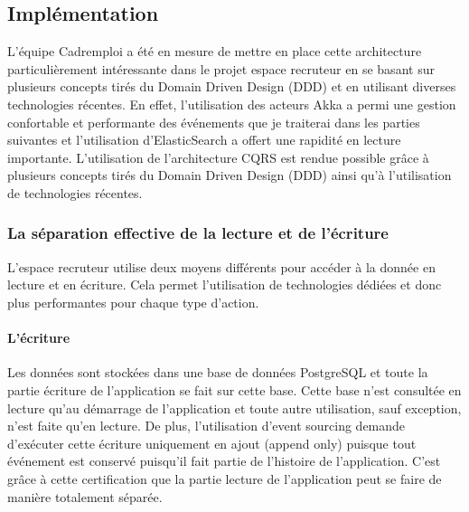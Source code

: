 \subsection{Implémentation}
\label{sub:Implémentation}
L'équipe Cadremploi a été en mesure de mettre en place cette architecture particulièrement intéressante dans le projet espace recruteur en se basant sur plusieurs concepts tirés du Domain Driven Design (DDD) et en utilisant diverses technologies récentes.
En effet, l'utilisation des acteurs Akka a permi une gestion confortable et performante des événements que je traiterai dans les parties suivantes et l'utilisation d'ElasticSearch a offert une rapidité en lecture importante.
L'utilisation de l'architecture CQRS est rendue possible grâce à plusieurs concepts tirés du Domain Driven Design (DDD) ainsi qu'à l'utilisation de technologies récentes.

\subsubsection{La séparation effective de la lecture et de l'écriture}
\label{subs:La séparation effective de la lecture et de l'écriture}
L'espace recruteur utilise deux moyens différents pour accéder à la donnée en lecture et en écriture.
Cela permet l'utilisation de technologies dédiées et donc plus performantes pour chaque type d'action.
\paragraph{L'écriture}
\label{par:L'écriture}
Les données sont stockées dans une base de données PostgreSQL et toute la partie écriture de l'application se fait sur cette base.
Cette base n'est consultée en lecture qu'au démarrage de l'application et toute autre utilisation, sauf exception, n'est faite qu'en lecture.
De plus, l'utilisation d'event sourcing demande d'exécuter cette écriture uniquement en ajout (append only) puisque tout événement est conservé puisqu'il fait partie de l'histoire de l'application.
C'est grâce à cette certification que la partie lecture de l'application peut se faire de manière totalement séparée.

